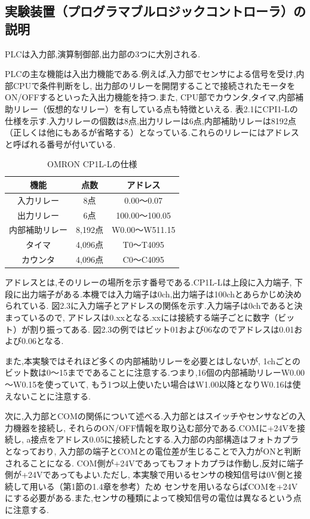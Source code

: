 \subsection{実験装置（プログラマブルロジックコントローラ）の説明}
PLCは入力部,演算制御部,出力部の3つに大別される.

PLCの主な機能は入出力機能である.例えば,入力部でセンサによる信号を受け,内部CPUで条件判断をし,
出力部のリレーを開閉することで接続されたモータをON/OFFするといった入出力機能を持つ.また,
CPU部でカウンタ,タイマ,内部補助リレー（仮想的なリレー）を有している点も特徴といえる.
表2.1にCPI1-Lの仕様を示す.入力リレーの個数は8点,出力リレーは6点,内部補助リレーは8192点
（正しくは他にもあるが省略する）となっている.これらのリレーにはアドレスと呼ばれる番号が付いている.

\begin{table}[h]
  \centering
  \caption{OMRON CP1L-Lの仕様}
  \begin{tabular}{|c|c|c|}
    \hline
    機能           & 点数    & アドレス       \\ \hline
    入力リレー     & 8点     & 0.00～0.07     \\ \hline
    出力リレー     & 6点     & 100.00～100.05 \\ \hline
    内部補助リレー & 8,192点 & W0.00～W511.15 \\ \hline
    タイマ         & 4,096点 & T0～T4095      \\ \hline
    カウンタ       & 4,096点 & C0～C4095      \\ \hline
  \end{tabular}
\end{table}

アドレスとは,そのリレーの場所を示す番号である.CP1L-Lは上段に入力端子,
下段に出力端子がある.本機では入力端子は0ch,出力端子は100chとあらかじめ決められている.
図2.3に入力端子とアドレスの関係を示す.入力端子は0chであると決まっているので,
アドレスは0.xxとなる.xxには接続する端子ごとに数字（ビット）が割り振ってある.
図2.3の例ではビット01および06なのでアドレスは0.01および0.06となる.

また,本実験ではそれほど多くの内部補助リレーを必要とはしないが,
1chごとのビット数は0～15までであることに注意する.つまり,16個の内部補助リレーW0.00～W0.15を使っていて,
もう1つ以上使いたい場合はW1.00以降となりW0.16は使えないことに注意する.

次に,入力部とCOMの関係について述べる.入力部とはスイッチやセンサなどの入力機器を接続し,
それらのON/OFF情報を取り込む部分である.COMに+24Vを接続し,
a接点をアドレス0.05に接続したとする.入力部の内部構造はフォトカプラとなっており,
入力部の端子とCOMとの電位差が生じることで入力がONと判断されることになる.
COM側が+24Vであってもフォトカプラは作動し,反対に端子側が+24Vであってもよい.ただし,
本実験で用いるセンサの検知信号は0V側と接続して用いる（第1節の1.4章を参考）ため
センサを用いるならばCOMを+24Vにする必要がある.また,センサの種類によって検知信号の電位は異なるという点に注意する.

